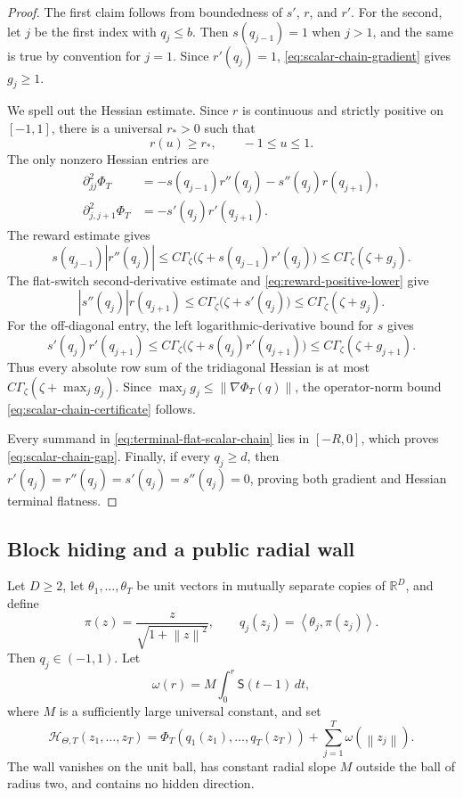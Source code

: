 \documentclass[11pt,a4paper]{article}
\newcommand{\R}{\mathbb{R}}
\newcommand{\norm}[1]{\left\lVert #1\right\rVert}
\newcommand{\inner}[2]{\left\langle #1,#2\right\rangle}
\theoremstyle{remark}
\begin{document}
\begin{proof}
The first claim follows from boundedness of $s'$, $r$, and $r'$.  For the
second, let $j$ be the first index with $q_j\le b$.  Then
$s(q_{j-1})=1$ when $j>1$, and the same is true by convention for $j=1$.
Since $r'(q_j)=1$, \eqref{eq:scalar-chain-gradient} gives $g_j\ge1$.

We spell out the Hessian estimate.  Since $r$ is continuous and strictly
positive on $[-1,1]$, there is a universal $r_*>0$ such that
\begin{equation}
 r(u)\ge r_*,\qquad -1\le u\le1.
 \label{eq:reward-positive-lower}
\end{equation}
The only nonzero Hessian entries are
\begin{align*}
 \partial_{jj}^2\Phi_T
 &=-s(q_{j-1})r''(q_j)-s''(q_j)r(q_{j+1}),\\
 \partial_{j,j+1}^2\Phi_T
 &=-s'(q_j)r'(q_{j+1}).
\end{align*}
The reward estimate gives
\[
 s(q_{j-1})|r''(q_j)|
 \le C\Gamma_\zeta\bigl(\zeta+s(q_{j-1})r'(q_j)\bigr)
 \le C\Gamma_\zeta(\zeta+g_j).
\]
The flat-switch second-derivative estimate and
\eqref{eq:reward-positive-lower} give
\[
 |s''(q_j)|r(q_{j+1})
 \le C\Gamma_\zeta\bigl(\zeta+s'(q_j)\bigr)
 \le C\Gamma_\zeta(\zeta+g_j).
\]
For the off-diagonal entry, the left logarithmic-derivative bound for $s$
gives
\[
 s'(q_j)r'(q_{j+1})
 \le C\Gamma_\zeta\bigl(\zeta+s(q_j)r'(q_{j+1})\bigr)
 \le C\Gamma_\zeta(\zeta+g_{j+1}).
\]
Thus every absolute row sum of the tridiagonal Hessian is at most
$C\Gamma_\zeta(\zeta+\max_jg_j)$.  Since
$\max_jg_j\le\norm{\nabla\Phi_T(q)}$, the operator-norm bound
\eqref{eq:scalar-chain-certificate} follows.

Every summand in \eqref{eq:terminal-flat-scalar-chain} lies in $[-R,0]$,
which proves \eqref{eq:scalar-chain-gap}.  Finally, if every $q_j\ge d$, then
$r'(q_j)=r''(q_j)=s'(q_j)=s''(q_j)=0$, proving both gradient and Hessian
terminal flatness.
\end{proof}

\subsection{Block hiding and a public radial wall}

Let $D\ge2$, let $\theta_1,\ldots,\theta_T$ be unit vectors in mutually
separate copies of $\R^D$, and define
\begin{equation}
 \pi(z)=\frac{z}{\sqrt{1+\norm z^2}},
 \qquad
 q_j(z_j)=\inner{\theta_j}{\pi(z_j)}.
 \label{eq:block-compression}
\end{equation}
Then $q_j\in(-1,1)$.  Let
\begin{equation}
 \omega(r)=M\int_0^r\mathsf S(t-1)\,dt,
 \label{eq:radial-wall}
\end{equation}
where $M$ is a sufficiently large universal constant, and set
\begin{equation}
 \mathcal H_{\Theta,T}(z_1,\ldots,z_T)
 =\Phi_T(q_1(z_1),\ldots,q_T(z_T))
  +\sum_{j=1}^T\omega(\norm{z_j}).
 \label{eq:block-terminal-chain}
\end{equation}
The wall vanishes on the unit ball, has constant radial slope $M$ outside
the ball of radius two, and contains no hidden direction.
\end{document}
